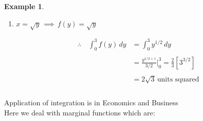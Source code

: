 \documentclass[11pt,a4paper]{article}
\theoremstyle{definition}
\newtheorem{example}[thm]{Example}
\begin{document}
\begin{enumerate}
\begin{example}
\begin{enumerate}
\begin{align*}
A &  = \int^3_1 \left[f(x) - g(x)\right]\,dx = \int^3_1\left[x^2 - \left(x^2 -2x\right)\right]\,dx\\\\
& = \int^3_12x\,dx\\\\
& = x^2\Bigg|^3_1\\\\
& = 9 - 1\\
& = 8\,\text{units squared}\\\\
\end{align*}




\item $x = \sqrt{y}\,\implies\, f(y) = \sqrt{y}$

\begin{figure}[H]
\centering
{}
\end{figure}














\begin{align*}
\therefore\quad  \int^3_0 f(y) \,dy & = \int^3_0y^{1/2}\,dy\\\\
& = \frac{y^{1/2+1}}{3/2}\Bigg|^3_0 = \frac{2}{3}\left[3^{3/2}\right]\\\\
& = 2\sqrt{3}\,\text{units squared}\\\\
\end{align*}
\end{enumerate}





\item Application of integration is in Economics and Business\\
Here we deal with marginal functions which are:\\


\end{example}
\end{enumerate}
\end{document}
